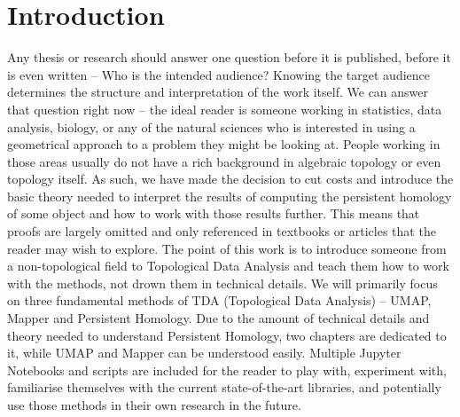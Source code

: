 \chapter*{Introduction}

Any thesis or research should answer one question before it is published, before it is even written -- Who is the intended audience? Knowing the target audience determines the structure and interpretation of the work itself. We can answer that question right now -- the ideal reader is someone working in statistics, data analysis, biology, or any of the natural sciences who is interested in using a geometrical approach to a problem they might be looking at. People working in those areas usually do not have a rich background in algebraic topology or even topology itself. As such, we have made the decision to cut costs and introduce the basic theory needed to interpret the results of computing the persistent homology of some object and how to work with those results further. This means that proofs are largely omitted and only referenced in textbooks or articles that the reader may wish to explore. The point of this work is to introduce someone from a non-topological field to Topological Data Analysis and teach them how to work with the methods, not drown them in technical details. We will primarily focus on three fundamental methods of TDA (Topological Data Analysis) -- UMAP, Mapper and Persistent Homology. Due to the amount of technical details and theory needed to understand Persistent Homology, two chapters are dedicated to it, while UMAP and Mapper can be understood easily. Multiple Jupyter Notebooks and scripts are included for the reader to play with, experiment with, familiarise themselves with the current state-of-the-art libraries, and potentially use those methods in their own research in the future.
